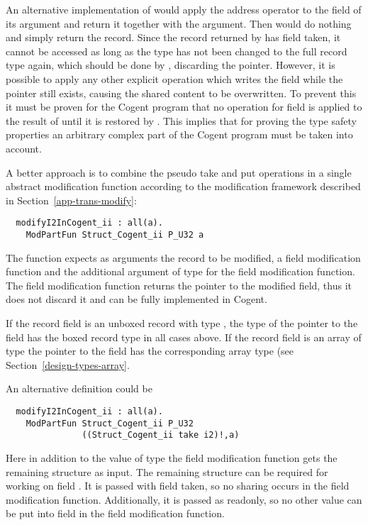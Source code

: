 An alternative implementation of  would apply the address operator to the field  of 
its argument and return it together with the argument. Then  would do nothing and simply 
return the record. Since the record returned by  has field  taken, it
cannot be accessed as long as the type has not been changed to the full record type again, which should be 
done by , discarding the pointer. However, it is possible to apply any other explicit 
operation which writes the field  while the pointer still exists, causing the shared content to
be overwritten. To prevent this it must be proven for the Cogent program that no  operation for field 
 is applied to the result of  until it is restored by . This implies that
for proving the type safety properties an arbitrary complex part of the Cogent program must be taken into
account.

A better approach is to combine the pseudo take and put operations in a single abstract modification function according
to the modification framework described in Section~\ref{app-trans-modify}:
\begin{verbatim}
  modifyI2InCogent_ii : all(a). 
    ModPartFun Struct_Cogent_ii P_U32 a
\end{verbatim}
The function expects as arguments the record to be modified, a field modification function and the additional argument
of type  for the field modification function. The field modification function
returns the pointer to the modified field, thus it does not discard it and can be fully implemented in Cogent.

If the record field is an unboxed record with type , the type of the pointer to the field has the boxed record
type  in all cases above. If the record field is an array of type  the pointer to the field
has the corresponding array type  (see Section~\ref{design-types-array}.

An alternative definition could be
\begin{verbatim}
  modifyI2InCogent_ii : all(a). 
    ModPartFun Struct_Cogent_ii P_U32
               ((Struct_Cogent_ii take i2)!,a)
\end{verbatim}
Here in addition to the value of type  the field modification function gets the remaining structure as input.
The remaining structure can be required for working on 
field . It is passed with field  taken, so no sharing occurs in the field modification function. Additionally,
it is passed as readonly, so no other value can be put into field  in the field modification function.

